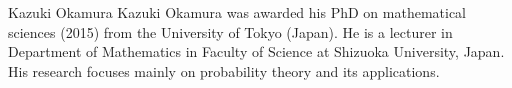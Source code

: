 \documentclass[journal]{IEEEtran}
\begin{document}


\begin{IEEEbiographynophoto}{Kazuki Okamura}
Kazuki Okamura was awarded his PhD on mathematical sciences (2015) from the University of Tokyo (Japan). 
He is a lecturer in Department of Mathematics in Faculty of Science at Shizuoka University, Japan.
His research focuses mainly on probability theory and its applications.
\end{IEEEbiographynophoto}






\end{document}
